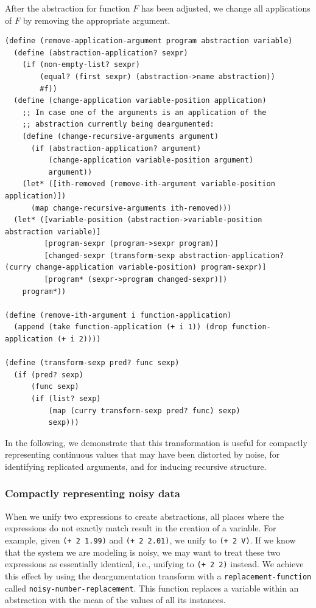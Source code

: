 \documentclass[a4paper,10pt]{article}
\begin{document}
After the abstraction for function $F$ has been adjusted, we change all applications of $F$ by removing the appropriate argument.
\begin{lstlisting}[frame=trbl]
(define (remove-application-argument program abstraction variable)
  (define (abstraction-application? sexpr)
    (if (non-empty-list? sexpr)
        (equal? (first sexpr) (abstraction->name abstraction))
        #f))
  (define (change-application variable-position application)
    ;; In case one of the arguments is an application of the
    ;; abstraction currently being deargumented:
    (define (change-recursive-arguments argument)
      (if (abstraction-application? argument)
          (change-application variable-position argument)
          argument))
    (let* ([ith-removed (remove-ith-argument variable-position application)])
      (map change-recursive-arguments ith-removed)))
  (let* ([variable-position (abstraction->variable-position abstraction variable)]
         [program-sexpr (program->sexpr program)]
         [changed-sexpr (transform-sexp abstraction-application? (curry change-application variable-position) program-sexpr)]
         [program* (sexpr->program changed-sexpr)])
    program*))

(define (remove-ith-argument i function-application)
  (append (take function-application (+ i 1)) (drop function-application (+ i 2))))

(define (transform-sexp pred? func sexp)
  (if (pred? sexp)
      (func sexp)
      (if (list? sexp)
          (map (curry transform-sexp pred? func) sexp)
          sexp)))
\end{lstlisting}
In the following, we demonstrate that this transformation is useful for compactly representing continuous values that may have been distorted by noise, for identifying replicated arguments, and for inducing recursive structure.

\subsubsection{Compactly representing noisy data}

When we unify two expressions to create abstractions, all places where the expressions do not exactly match result in the creation of a variable. For example, given \texttt{(+ 2 1.99)} and \texttt{(+ 2 2.01)}, we unify to \texttt{(+ 2 V)}. If we know that the system we are modeling is noisy, we may want to treat these two expressions as essentially identical, i.e., unifying to \texttt{(+ 2 2)} instead. We achieve this effect by using the deargumentation transform with a \texttt{replacement-function} called \texttt{noisy-number-replacement}. This function replaces a variable within an abstraction with the mean of the values of all its instances.
\end{document}
